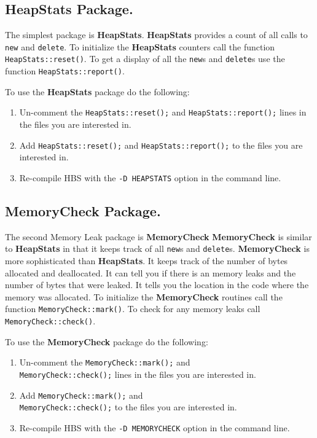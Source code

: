 \subsection{HeapStats Package.}
The simplest package is {\bf HeapStats}\cite{Carg90}.  {\bf HeapStats}
provides a count of all calls to {\tt new} and {\tt delete}.  To initialize
the {\bf HeapStats} counters call the function {\tt HeapStats::reset()}.
To get a display of all the {\tt new}s and {\tt delete}s use the function
{\tt HeapStats::report()}.

To use the {\bf HeapStats} package do the following:
\begin{enumerate}
\item{Un-comment the {\tt HeapStats::reset();} and {\tt HeapStats::report();}
lines in the files you are interested in.}
\item{Add {\tt HeapStats::reset();} and {\tt HeapStats::report();} to the
files you are interested in.}
\item{Re-compile HBS with the {\tt -D HEAPSTATS} option in the command line.}
\end{enumerate}
\subsection{MemoryCheck Package.}
The second Memory Leak package is {\bf MemoryCheck}\cite{Kanz94}  {\bf
MemoryCheck} is similar to {\bf HeapStats} in that it keeps track of all
{\tt new}s and {\tt delete}s.  {\bf MemoryCheck} is more sophisticated than
{\bf HeapStats}.  It keeps track of the number of bytes allocated and
deallocated.  It can tell you if there is an memory leaks and the number of
bytes that were leaked.  It tells you the location in the code where the
memory was allocated.  To initialize the {\bf MemoryCheck} routines call
the function {\tt MemoryCheck::mark()}.  To check for any memory leaks call
{\tt MemoryCheck::check()}.

To use the {\bf MemoryCheck} package do the following:
\begin{enumerate}
\item{Un-comment the {\tt MemoryCheck::mark();} and \\
{\tt MemoryCheck::check();} lines in the files you are interested in.}
\item{Add {\tt MemoryCheck::mark();} and \\
{\tt MemoryCheck::check();} to the files you are interested in.}
\item{Re-compile HBS with the {\tt -D MEMORYCHECK} option in the command line.}
\end{enumerate}


